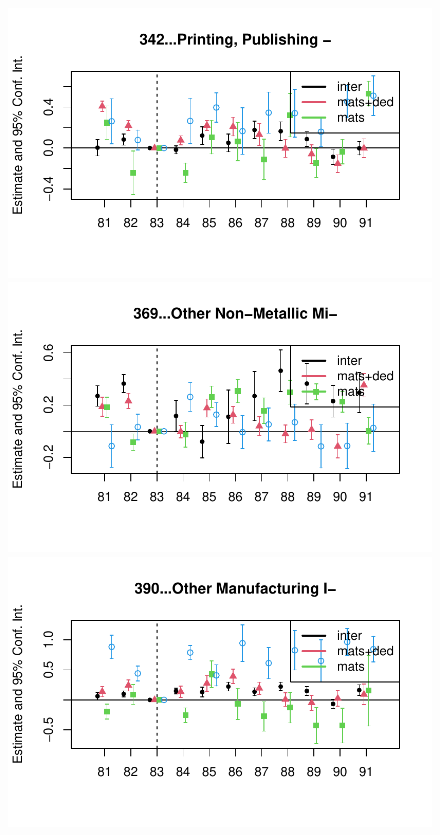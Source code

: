 \documentclass[
  12pt]{article}
\theoremstyle{definition}
\theoremstyle{remark}
\begin{document}
\begin{figure}
\begin{minipage}{\linewidth}
\includegraphics{Tax-Prod_files/figure-pdf/unnamed-chunk-12-10.pdf}

\includegraphics{Tax-Prod_files/figure-pdf/unnamed-chunk-12-11.pdf}

\includegraphics{Tax-Prod_files/figure-pdf/unnamed-chunk-12-12.pdf}


\end{minipage}
\end{figure}
\end{document}
